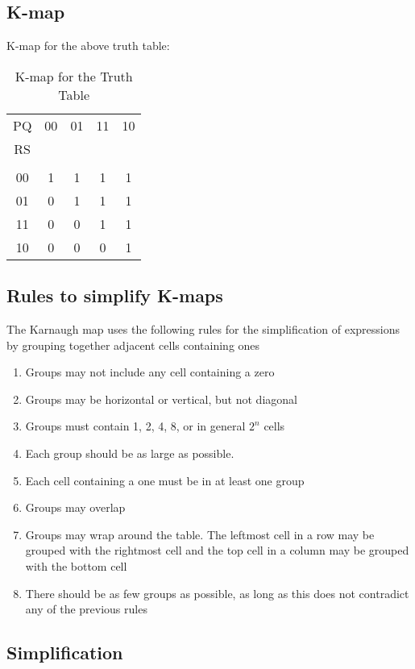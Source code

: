 \documentclass[journal,12pt,twocolumn]{IEEEtran}
\begin{document}
\subsection{K-map}
K-map for the above truth table:
\begin{table}[h]
    \centering
    \begin{tabular}{|c|c|c|c|c|}
        \hline 
         {PQ} &00&01&11&10
         \\ RS & & & &\\ \hline & & & &
         \\00 &1&1&1&1 
         \\01&0&1&1&1
         \\11&0&0&1&1
         \\10&0&0&0&1
         \\ \hline
    \end{tabular}
    \vspace{9pt}
    \caption{K-map for the Truth Table}
    \label{tab:my_label}
\end{table}
\subsection{Rules to simplify K-maps}
The Karnaugh map uses the following rules for the simplification of expressions by grouping together adjacent cells containing ones
\vspace{4pt}
\begin{enumerate}[itemsep=5pt]
    \item Groups may not include any cell containing a zero
    \item Groups may be horizontal or vertical, but not diagonal
    \item Groups must contain 1, 2, 4, 8, or in general $2^n$ cells
    \item Each group should be as large as possible.
    \item Each cell containing a one must be in at least one group
    \item Groups may overlap
    \item Groups may wrap around the table. The leftmost cell in a row may be grouped with the rightmost cell and the top cell in a column may be grouped with the bottom cell 
    \item There should be as few groups as possible, as long as this does not contradict any of the previous rules
\end{enumerate}
\newpage
\subsection{Simplification}
\end{document}
